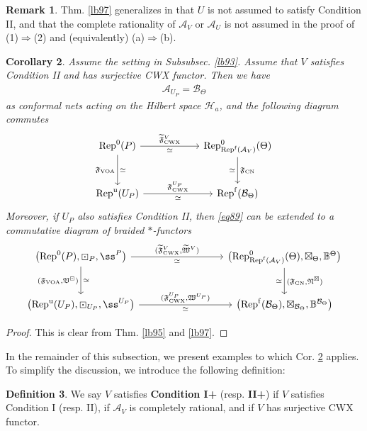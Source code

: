 \documentclass[11pt,b5paper,notitlepage]{article}
\theoremstyle{definition}
\newtheorem{df}{Definition}[section]
\newtheorem{rem}[df]{Remark}
\theoremstyle{plain}
\newtheorem{co}[df]{Corollary}
\newcommand{\fk}{\mathfrak}
\newcommand{\mc}{\mathcal}
\newcommand{\wtd}{\widetilde}
\newcommand{\Rep}{\mathrm{Rep}}
\newcommand{\Repf}{\mathrm{Rep}^{\mathrm f}}
\newcommand{\CWX}{{\scriptscriptstyle \mathrm{CWX}}}
\newcommand{\tFVCWX}{{\widetilde{\mathfrak F}^V_{\scriptscriptstyle \mathrm{CWX}}}}
\newcommand{\VOA}{{\scriptscriptstyle \mathrm{VOA}}}
\newcommand{\CN}{{\scriptscriptstyle \mathrm{CN}}}
\newcommand{\RepUP}{\mathrm{Rep}^{\mathrm u}(U_P)}
\numberwithin{equation}{section}
\begin{document}
\begin{rem}
Thm. \ref{lb97} generalizes \cite[Thm. 2.7.2]{Gui20} in that $U$ is not assumed to satisfy Condition II, and that the complete rationality of $\mc A_V$ or $\mc A_U$ is not assumed in the proof of (1)$\Rightarrow$(2) and (equivalently) (a)$\Rightarrow$(b).
\end{rem}


\begin{co}\label{lb117}
Assume the setting in Subsubsec. \ref{lb93}. Assume that $V$ satisfies Condition II and has surjective CWX functor. Then we have
\begin{align*}
\mc A_{U_P}=\mc B_\Theta
\end{align*}
as conformal nets acting on the Hilbert space $\mc H_a$, and the following diagram commutes
\begin{equation}\label{eq89}
\begin{tikzcd}[row sep=large,column sep=2cm]
\Rep^0(P) \arrow[r,"\tFVCWX","\simeq"'] \arrow[d,"{\fk F_\VOA}"',"\simeq"] & \Rep^0_{\Repf(\mc A_V)}(\Theta) \arrow[d,"{\fk F_\CN}","\simeq"'] \\
\RepUP \arrow[r,"{\fk F^{U_P}_\CWX}","\simeq"']           & \Repf(\mc B_\Theta)          
\end{tikzcd}
\end{equation}
Moreover, if $U_P$ also satisfies Condition II, then \eqref{eq89} can be extended to a commutative diagram of braided $*$-functors
\begin{equation}
\begin{tikzcd}[row sep=large,column sep=3cm]
\big(\Rep^0(P),\boxdot_P,\ss^P\big) \arrow[r,"{(\tFVCWX,\wtd{\fk W}^V)}","\simeq"'] \arrow[d,"{(\fk F_\VOA,\fk V^\boxdot)}"',"\simeq"] & \big(\Rep^0_{\Repf(\mc A_V)}(\Theta),\boxtimes_\Theta,\mathbb B^\Theta \big)\arrow[d,"{(\fk F_\CN,\fk N^\boxtimes)}","\simeq"'] \\
\big(\RepUP,\boxdot_{U_P},\ss^{U_P} \big)\arrow[r,"{(\fk F^{U_P}_\CWX,\fk W^{U_P})}","\simeq"']           & \big(\Repf(\mc B_\Theta),\boxtimes_{\mc B_\Theta},\mathbb B^{\mc B_\Theta} \big)         
\end{tikzcd}
\end{equation}
\end{co}

\begin{proof}
This is clear from Thm. \ref{lb95} and \ref{lb97}.
\end{proof}


In the remainder of this subsection, we present examples to which Cor. \ref{lb117} applies. To simplify the discussion, we introduce the following definition:
\begin{df}
We say $V$ satisfies \textbf{Condition I+} (resp. \textbf{II+}) if $V$ satisfies Condition I (resp. II), if $\mc A_V$ is completely rational, and if $V$ has surjective CWX functor. 
\end{df}
\end{document}
